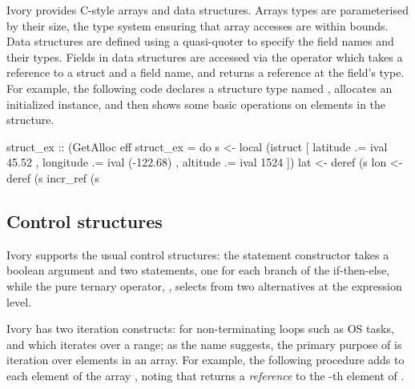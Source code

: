 Ivory provides C-style arrays and data structures.  Arrays types are
parameterised by their size, the type system ensuring that array accesses
are within bounds.  Data structures are defined using a quasi-quoter
to specify the field names and their types.  Fields in data structures
are accessed via the \cd{\mytilde>} operator which takes a
reference to a struct and a field name, and returns a reference at the
field's type. For example, the following code declares a structure
type named , allocates an initialized instance, and then
shows some basic operations on elements in the structure.

\begin{code}
struct_ex :: (GetAlloc eff %
struct_ex = do
  s <- local (istruct [ latitude  .= ival 45.52
                      , longitude .= ival (-122.68)
                      , altitude  .= ival 1524 ])
  lat <- deref (s %
  lon <- deref (s %
  incr_ref (s %
\end{code}

\subsection{Control structures}
\label{sec:control}

Ivory supports the usual control structures: the  statement
constructor takes a boolean argument and two statements, one for each
branch of the if-then-else, while the pure ternary operator, ,
selects from two alternatives at the expression level.

Ivory has two iteration constructs:  for non-terminating
loops such as OS tasks, and  which iterates over a range;
as the name suggests, the primary purpose of  is
iteration over elements in an array.  For example, the following
procedure adds  to each element of the array , noting
that  returns a \emph{reference} to the -th
element of .

